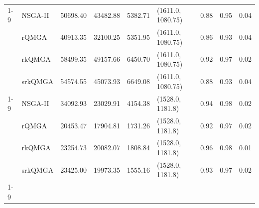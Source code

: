 \begin{tabular}{llrrrlrrr}
\cline{1-9}
\multirow[t]{4}{*}{la29} & NSGA-II & 50698.40 & 43482.88 & 5382.71 & (1611.0, 1080.75) & 0.88 & 0.95 & 0.04 \\
 & rQMGA & 40913.35 & 32100.25 & 5351.95 & (1611.0, 1080.75) & 0.86 & 0.93 & 0.04 \\
 & rkQMGA & 58499.35 & 49157.66 & 6450.70 & (1611.0, 1080.75) & 0.92 & 0.97 & 0.02 \\
 & srkQMGA & 54574.55 & 45073.93 & 6649.08 & (1611.0, 1080.75) & 0.88 & 0.93 & 0.04 \\
\cline{1-9}
\multirow[t]{4}{*}{la40} & NSGA-II & 34092.93 & 23029.91 & 4154.38 & (1528.0, 1181.8) & 0.94 & 0.98 & 0.02 \\
 & rQMGA & 20453.47 & 17904.81 & 1731.26 & (1528.0, 1181.8) & 0.92 & 0.97 & 0.02 \\
 & rkQMGA & 23254.73 & 20082.07 & 1808.84 & (1528.0, 1181.8) & 0.96 & 0.98 & 0.01 \\
 & srkQMGA & 23425.00 & 19973.35 & 1555.16 & (1528.0, 1181.8) & 0.93 & 0.97 & 0.02 \\
\cline{1-9}
\bottomrule
\end{tabular}
